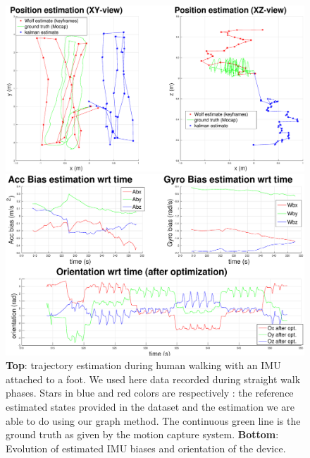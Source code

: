 
\begin{figure}[tb]
\centering
\includegraphics[scale=0.182]{figures/experiments/straight_walk/XY_XZ_viewsRotated.eps}
\par\vspace{4mm}
\includegraphics[scale=0.182]{figures/experiments/straight_walk/bias_orientation.eps}
\caption{ 
{\bf Top}: trajectory estimation during human walking with an IMU attached to a foot. We used here data recorded during straight walk phases. Stars in blue and red colors are respectively : the reference estimated states provided in the dataset and the estimation we are able to do using our graph method.
The continuous green line is the ground truth as given by the motion capture system.
{\bf Bottom}: Evolution of estimated IMU biases and orientation of the device.
}
\label{fig:straight_walk}
\end{figure}

